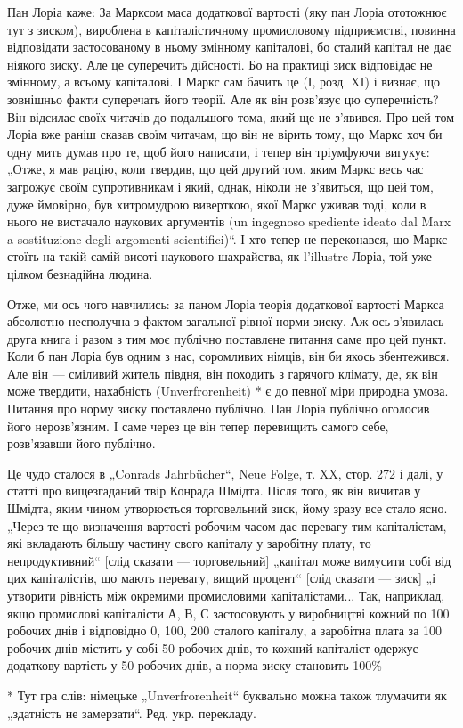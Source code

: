 Пан Лоріа каже: За Марксом маса додаткової вартості (яку
пан Лоріа ототожнює тут з зиском), вироблена в капіталістичному
промисловому підприємстві, повинна відповідати застосованому
в ньому змінному капіталові, бо сталий капітал не дає
ніякого зиску. Але це суперечить дійсності. Бо на практиці зиск
відповідає не змінному, а всьому капіталові. І Маркс сам бачить
це (І, розд. XI) і визнає, що зовнішньо факти суперечать
його теорії. Але як він розв’язує цю суперечність? Він відсилає
своїх читачів до подальшого тома, який ще не з’явився.
Про цей том Лоріа вже раніш сказав своїм читачам, що він
не вірить тому, що Маркс хоч би одну мить думав про те,
щоб його написати, і тепер він тріумфуючи вигукує: „Отже,
я мав рацію, коли твердив, що цей другий том, яким Маркс
весь час загрожує своїм супротивникам і який, однак, ніколи
не з’явиться, що цей том, дуже ймовірно, був хитромудрою
виверткою, якої Маркс уживав тоді, коли в нього не
вистачало наукових аргументів (un ingegnoso spediente ideato
dal Marx a sostituzione degli argomenti scientifici)“. І хто тепер
не переконався, що Маркс стоїть на такій самій висоті наукового
шахрайства, як l'illustre Лоріа, той уже цілком безнадійна
людина.

Отже, ми ось чого навчились: за паном Лоріа теорія додаткової
вартості Маркса абсолютно несполучна з фактом загальної
рівної норми зиску. Аж ось з’явилась друга книга і разом
з тим моє публічно поставлене питання саме про цей пункт.
Коли б пан Лоріа був одним з нас, соромливих німців, він би
якось збентежився. Але він — сміливий житель півдня, він походить
з гарячого клімату, де, як він може твердити, нахабність
(Unverfrorenheit) * є до певної міри природна умова. Питання
про норму зиску поставлено публічно. Пан Лоріа публічно оголосив
його нерозв’язним. І саме через це він тепер перевищить
самого себе, розв’язавши його публічно.

Це чудо сталося в „Conrads Jahrbücher“, Neue Folge, т. XX,
стор. 272 і далі, у статті про вищезгаданий твір Конрада Шмідта.
Після того, як він вичитав у Шмідта, яким чином утворюється
торговельний зиск, йому зразу все стало ясно. „Через те що
визначення вартості робочим часом дає перевагу тим капіталістам,
які вкладають більшу частину свого капіталу у заробітну
плату, то непродуктивний“ [слід сказати — торговельний] „капітал
може вимусити собі від цих капіталістів, що мають перевагу,
вищий процент“ [слід сказати — зиск] „і утворити рівність
між окремими промисловими капіталістами... Так, наприклад,
якщо промислові капіталісти А, В, С застосовують у виробництві
кожний по 100 робочих днів і відповідно 0, 100, 200
сталого капіталу, а заробітна плата за 100 робочих днів містить
у собі 50 робочих днів, то кожний капіталіст одержує додаткову
вартість у 50 робочих днів, а норма зиску становить 100\%

   * Тут гра слів: німецьке „Unverfrorenheit“ буквально можна також тлумачити
як „здатність не замерзати“. Ред. укр. перекладу.
\parbreak{}  %
